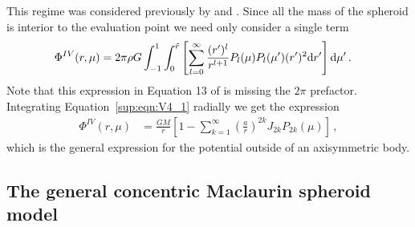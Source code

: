 \documentclass[11pt, oneside]{article}   	%
\begin{document}
This regime was considered previously by \cite{Hubbard2012} and \cite{Kong2013}.
Since all the mass of the spheroid is interior to the evaluation point we need only consider a single term
%
\begin{align}
\label{sup:eqn:V4_1}
 \Phi^{IV} {} & (r,\mu)= 2\pi \rho G \int_{-1}^{1} \int_0^{\tilde{r}} \left [ \sum_{l=0}^{\infty} \frac{(r')^l}{r^{l+1}} P_l(\mu)P_l(\mu') (r')^2 {\rm d}r' \right ] {\rm d}\mu' \,.
\end{align}
%
Note that this expression in Equation 13 of \cite{Kong2013} is missing the $2\pi$ prefactor.
Integrating Equation~\ref{sup:eqn:V4_1} radially we get the expression
%
\begin{align}
\Phi^{IV}(r,\mu) {} &= \frac{G M}{r} \left [ 1-\sum_{k=1}^{\infty} \left ( \frac{a}{r} \right )^{2k} J_{2k} P_{2k}(\mu) \right ] \,,
\end{align}
%
which is the general expression for the potential outside of an axisymmetric body.


\subsection{The general concentric Maclaurin spheroid model}
\end{document}
